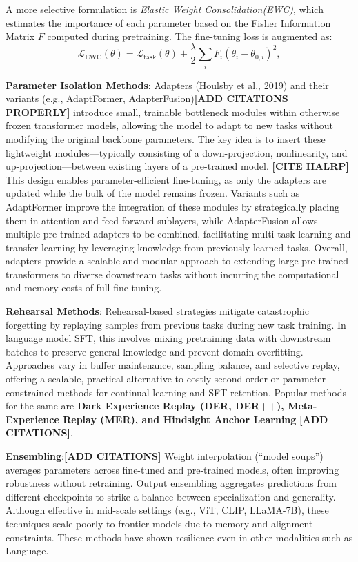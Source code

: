 A more selective formulation is \textit{Elastic Weight Consolidation(EWC)}, which estimates the importance of each parameter based on the Fisher Information Matrix $F$ computed during pretraining.  
The fine-tuning loss is augmented as:
$$
\mathcal{L}_{\text{EWC}}(\theta) = \mathcal{L}_{\text{task}}(\theta) + \frac{\lambda}{2} \sum_i F_i (\theta_i - \theta_{0,i})^2,
$$


\noindent \textbf{Parameter Isolation Methods}: Adapters (Houlsby et al., 2019) and their variants (e.g., AdaptFormer, AdapterFusion)\textbf{[ADD CITATIONS PROPERLY]} introduce small, trainable bottleneck modules within otherwise frozen transformer models, allowing the model to adapt to new tasks without modifying the original backbone parameters. The key idea is to insert these lightweight modules—typically consisting of a down-projection, nonlinearity, and up-projection—between existing layers of a pre-trained model. \textbf{[CITE HALRP]} This design enables parameter-efficient fine-tuning, as only the adapters are updated while the bulk of the model remains frozen. Variants such as AdaptFormer improve the integration of these modules by strategically placing them in attention and feed-forward sublayers, while AdapterFusion allows multiple pre-trained adapters to be combined, facilitating multi-task learning and transfer learning by leveraging knowledge from previously learned tasks. Overall, adapters provide a scalable and modular approach to extending large pre-trained transformers to diverse downstream tasks without incurring the computational and memory costs of full fine-tuning.


\noindent \textbf{Rehearsal Methods}: Rehearsal-based strategies mitigate catastrophic forgetting by replaying samples from previous tasks during new task training. In language model SFT, this involves mixing pretraining data with downstream batches to preserve general knowledge and prevent domain overfitting. Approaches vary in buffer maintenance, sampling balance, and selective replay, offering a scalable, practical alternative to costly second-order or parameter-constrained methods for continual learning and SFT retention. Popular methods for the same are \textbf{Dark Experience Replay (DER, DER++), Meta-Experience Replay (MER), and Hindsight Anchor Learning} \cite{NEURIPS2020_b704ea2c} \textbf{[ADD CITATIONS]}.


\noindent \textbf{Ensembling}:\textbf{[ADD CITATIONS]} Weight interpolation (“model soups”) averages parameters across fine-tuned and pre-trained models, often improving robustness without retraining.
Output ensembling aggregates predictions from different checkpoints to strike a balance between specialization and generality. Although effective in mid-scale settings (e.g., ViT, CLIP, LLaMA-7B), these techniques scale poorly to frontier models due to memory and alignment constraints. These methods have shown resilience even in other modalities such as Language.


